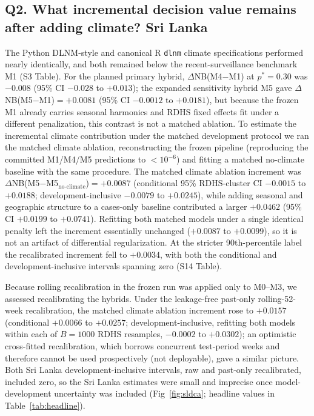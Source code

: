 \documentclass[11pt,a4paper]{article}
\begin{document}
\subsection{Q2. What incremental decision value remains after adding climate? Sri Lanka}
The Python DLNM-style and canonical R \texttt{dlnm} climate specifications performed nearly identically, and both remained below the recent-surveillance benchmark M1 (S3 Table). For the planned primary hybrid, $\Delta$NB(M4$-$M1) at $p^*=0.30$ was $-0.008$ (95\% CI $-0.028$ to $+0.013$); the expanded sensitivity hybrid M5 gave $\Delta$NB(M5$-$M1)$=+0.0081$ (95\% CI $-0.0012$ to $+0.0181$), but because the frozen M1 already carries seasonal harmonics and RDHS fixed effects fit under a different penalization, this contrast is not a matched ablation. To estimate the incremental climate contribution under the matched development protocol we ran the matched climate ablation, reconstructing the frozen pipeline (reproducing the committed M1/M4/M5 predictions to $<10^{-6}$) and fitting a matched no-climate baseline with the same procedure. The matched climate ablation increment was $\Delta$NB(M5$-$M5$_{\text{no-climate}}$)$=+0.0087$ (conditional 95\% RDHS-cluster CI $-0.0015$ to $+0.0188$; development-inclusive $-0.0079$ to $+0.0245$), while adding seasonal and geographic structure to a cases-only baseline contributed a larger $+0.0462$ (95\% CI $+0.0199$ to $+0.0741$). Refitting both matched models under a single identical penalty left the increment essentially unchanged ($+0.0087$ to $+0.0099$), so it is not an artifact of differential regularization. At the stricter 90th-percentile label the recalibrated increment fell to $+0.0034$, with both the conditional and development-inclusive intervals spanning zero (S14 Table).

Because rolling recalibration in the frozen run was applied only to M0--M3, we assessed recalibrating the hybrids. Under the leakage-free past-only rolling-52-week recalibration, the matched climate ablation increment rose to $+0.0157$ (conditional $+0.0066$ to $+0.0257$; development-inclusive, refitting both models within each of $B=1000$ RDHS resamples, $-0.0002$ to $+0.0302$); an optimistic cross-fitted recalibration, which borrows concurrent test-period weeks and therefore cannot be used prospectively (not deployable), gave a similar picture. Both Sri Lanka development-inclusive intervals, raw and past-only recalibrated, included zero, so the Sri Lanka estimates were small and imprecise once model-development uncertainty was included (Fig~\ref{fig:sldca}; headline values in Table~\ref{tab:headline}).
\end{document}
